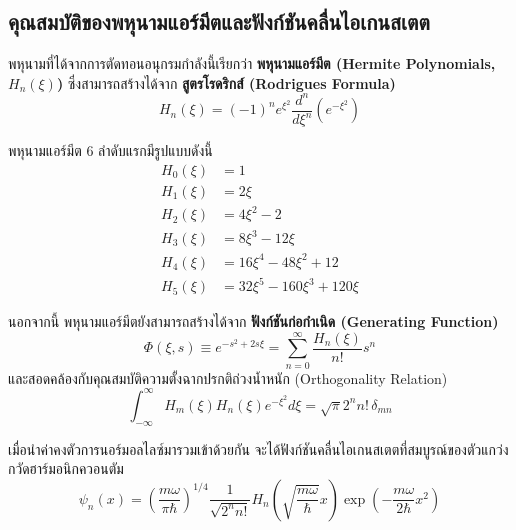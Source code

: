 \subsection{คุณสมบัติของพหุนามแอร์มีตและฟังก์ชันคลื่นไอเกนสเตต}
พหุนามที่ได้จากการตัดทอนอนุกรมกำลังนี้เรียกว่า \textbf{พหุนามแอร์มีต (Hermite Polynomials, $H_n(\xi)$)} ซึ่งสามารถสร้างได้จาก \textbf{สูตรโรดริกส์ (Rodrigues Formula)}
\begin{equation}
H_n(\xi) = (-1)^n e^{\xi^2} \frac{d^n}{d\xi^n} \left( e^{-\xi^2} \right)
\end{equation}

พหุนามแอร์มีต 6 ลำดับแรกมีรูปแบบดังนี้
\begin{align}
H_0(\xi) &= 1 \\
H_1(\xi) &= 2\xi \\
H_2(\xi) &= 4\xi^2 - 2 \\
H_3(\xi) &= 8\xi^3 - 12\xi \\
H_4(\xi) &= 16\xi^4 - 48\xi^2 + 12 \\
H_5(\xi) &= 32\xi^5 - 160\xi^3 + 120\xi
\end{align}

นอกจากนี้ พหุนามแอร์มีตยังสามารถสร้างได้จาก \textbf{ฟังก์ชันก่อกำเนิด (Generating Function)}
\begin{equation}
\Phi(\xi, s) \equiv e^{-s^2 + 2s\xi} = \sum_{n=0}^\infty \frac{H_n(\xi)}{n!} s^n
\end{equation}
และสอดคล้องกับคุณสมบัติความตั้งฉากปรกติถ่วงน้ำหนัก (Orthogonality Relation)
\begin{equation}
\int_{-\infty}^\infty H_m(\xi) H_n(\xi) e^{-\xi^2} d\xi = \sqrt{\pi} 2^n n! \, \delta_{mn}
\end{equation}

เมื่อนำค่าคงตัวการนอร์มอลไลซ์มารวมเข้าด้วยกัน จะได้ฟังก์ชันคลื่นไอเกนสเตตที่สมบูรณ์ของตัวแกว่งกวัดฮาร์มอนิกควอนตัม
\begin{equation}
\psi_n(x) = \left( \frac{m\omega}{\pi\hbar} \right)^{1/4} \frac{1}{\sqrt{2^n n!}} H_n\left(\sqrt{\frac{m\omega}{\hbar}} x\right) \exp\left( -\frac{m\omega}{2\hbar} x^2 \right) \label{eq_sho_normalized_wavefunction}
\end{equation}

